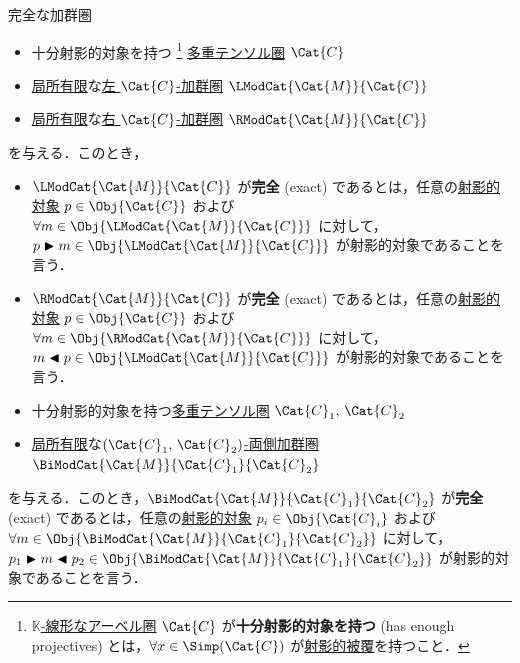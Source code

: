 \documentclass[TQFT_main]{subfiles}
\begin{document}
\begin{mydef}[label=def:modulecat-exact,breakable]{完全な加群圏}
    \begin{itemize}
        \item 十分射影的対象を持つ
            \footnote{\hyperref[def:additive-cat]{$\mathbb{K}$-線形なアーベル圏} $\Cat{C}$ が\textbf{十分射影的対象を持つ} (has enough projectives) とは，$\forall x \in \Simp(\Cat{C})$ が\hyperref[def:finite-abcat]{射影的被覆}を持つこと．}
            \hyperref[def:tensorfusion-cat]{多重テンソル圏} $\Cat{C}$
        \item \hyperref[def:finite-abcat]{局所有限}な\hyperref[def:modulecat]{左 $\Cat{C}$-加群圏} $\LModCat{\Cat{M}}{\Cat{C}}$
        \item \hyperref[def:finite-abcat]{局所有限}な\hyperref[def:modulecat]{右 $\Cat{C}$-加群圏} $\RModCat{\Cat{M}}{\Cat{C}}$
    \end{itemize}
    を与える．このとき，
    \begin{itemize}
        \item $\LModCat{\Cat{M}}{\Cat{C}}$ が\textbf{完全} (exact) であるとは，任意の\hyperref[def:finite-abcat]{射影的対象} $p \in \Obj{\Cat{C}}$ および $\forall m \in \Obj{\LModCat{\Cat{M}}{\Cat{C}}}$ に対して，$p \btr m \in \Obj{\LModCat{\Cat{M}}{\Cat{C}}}$ が射影的対象であることを言う．
        \item $\RModCat{\Cat{M}}{\Cat{C}}$ が\textbf{完全} (exact) であるとは，任意の\hyperref[def:finite-abcat]{射影的対象} $p \in \Obj{\Cat{C}}$ および $\forall m \in \Obj{\RModCat{\Cat{M}}{\Cat{C}}}$ に対して，$m \btl p \in \Obj{\LModCat{\Cat{M}}{\Cat{C}}}$ が射影的対象であることを言う．
    \end{itemize}
    
    \tcblower

    \begin{itemize}
        \item 十分射影的対象を持つ\hyperref[def:tensorfusion-cat]{多重テンソル圏} $\Cat{C}_1,\, \Cat{C}_2$
        \item \hyperref[def:finite-abcat]{局所有限}な\hyperref[def:bimodulecat]{$(\Cat{C}_1,\, \Cat{C}_2)$-両側加群圏} $\BiModCat{\Cat{M}}{\Cat{C}_1}{\Cat{C}_2}$
    \end{itemize}
    を与える．このとき，$\BiModCat{\Cat{M}}{\Cat{C}_1}{\Cat{C}_2}$ が\textbf{完全} (exact) であるとは，任意の\hyperref[def:finite-abcat]{射影的対象} $p_i \in \Obj{\Cat{C}_i}$ および $\forall m \in \Obj{\BiModCat{\Cat{M}}{\Cat{C}_1}{\Cat{C}_2}}$ に対して，$p_1 \btr m \btl p_2 \in \Obj{\BiModCat{\Cat{M}}{\Cat{C}_1}{\Cat{C}_2}}$ が射影的対象であることを言う．
\end{mydef}
\end{document}
